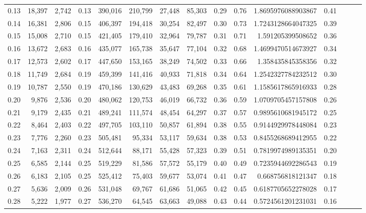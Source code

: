 \begin{tabular}{rrrrrrrrrrrrrrr}
0.13 &  18,397 &  2,742 &  0.13 &  390,016 &  210,799 &   27,448 &   85,303 &  0.29 &  0.76 &      1.8695976088903867 &      0.41 \\
0.14 &  16,381 &  2,806 &  0.15 &  406,397 &  194,418 &   30,254 &   82,497 &  0.30 &  0.73 &      1.7243128664047325 &      0.39 \\
0.15 &  15,008 &  2,710 &  0.15 &  421,405 &  179,410 &   32,964 &   79,787 &  0.31 &  0.71 &       1.591205399508652 &      0.36 \\
0.16 &  13,672 &  2,683 &  0.16 &  435,077 &  165,738 &   35,647 &   77,104 &  0.32 &  0.68 &      1.4699470514673927 &      0.34 \\
0.17 &  12,573 &  2,602 &  0.17 &  447,650 &  153,165 &   38,249 &   74,502 &  0.33 &  0.66 &       1.358435845358356 &      0.32 \\
0.18 &  11,749 &  2,684 &  0.19 &  459,399 &  141,416 &   40,933 &   71,818 &  0.34 &  0.64 &      1.2542327784232512 &      0.30 \\
0.19 &  10,787 &  2,550 &  0.19 &  470,186 &  130,629 &   43,483 &   69,268 &  0.35 &  0.61 &      1.1585617865916933 &      0.28 \\
0.20 &   9,876 &  2,536 &  0.20 &  480,062 &  120,753 &   46,019 &   66,732 &  0.36 &  0.59 &      1.0709705457157808 &      0.26 \\
0.21 &   9,179 &  2,435 &  0.21 &  489,241 &  111,574 &   48,454 &   64,297 &  0.37 &  0.57 &      0.9895610681945172 &      0.25 \\
0.22 &   8,464 &  2,403 &  0.22 &  497,705 &  103,110 &   50,857 &   61,894 &  0.38 &  0.55 &      0.9144929978448084 &      0.23 \\
0.23 &   7,776 &  2,260 &  0.23 &  505,481 &   95,334 &   53,117 &   59,634 &  0.38 &  0.53 &      0.8455268689412955 &      0.22 \\
0.24 &   7,163 &  2,311 &  0.24 &  512,644 &   88,171 &   55,428 &   57,323 &  0.39 &  0.51 &      0.7819974989135351 &      0.20 \\
0.25 &   6,585 &  2,144 &  0.25 &  519,229 &   81,586 &   57,572 &   55,179 &  0.40 &  0.49 &      0.7235944692286543 &      0.19 \\
0.26 &   6,183 &  2,105 &  0.25 &  525,412 &   75,403 &   59,677 &   53,074 &  0.41 &  0.47 &       0.668756818121347 &      0.18 \\
0.27 &   5,636 &  2,009 &  0.26 &  531,048 &   69,767 &   61,686 &   51,065 &  0.42 &  0.45 &      0.6187705652278028 &      0.17 \\
0.28 &   5,222 &  1,977 &  0.27 &  536,270 &   64,545 &   63,663 &   49,088 &  0.43 &  0.44 &      0.5724561201231031 &      0.16 \\

\end{tabular}
